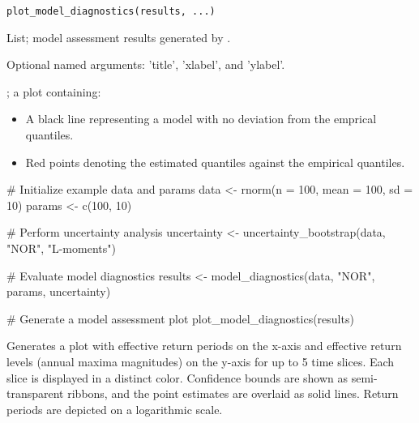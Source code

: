 \documentclass[a4paper]{book}
\begin{document}
%
\begin{Usage}
\begin{verbatim}
plot_model_diagnostics(results, ...)
\end{verbatim}
\end{Usage}
%
\begin{Arguments}
\begin{ldescription}
\item[\code{results}] List; model assessment results generated by .

\item[\code{...}] Optional named arguments: 'title', 'xlabel', and 'ylabel'.
\end{ldescription}
\end{Arguments}
%
\begin{Value}
; a plot containing:
\begin{itemize}

\item{} A black line representing a model with no deviation from the emprical quantiles.
\item{} Red points denoting the estimated quantiles against the empirical quantiles.

\end{itemize}

\end{Value}
%
\begin{Examples}
\begin{ExampleCode}
# Initialize example data and params
data <- rnorm(n = 100, mean = 100, sd = 10)
params <- c(100, 10)

# Perform uncertainty analysis
uncertainty <- uncertainty_bootstrap(data, "NOR", "L-moments")

# Evaluate model diagnostics
results <- model_diagnostics(data, "NOR", params, uncertainty)

# Generate a model assessment plot
plot_model_diagnostics(results)

\end{ExampleCode}
\end{Examples}
%
\begin{Description}
Generates a plot with effective return periods on the x-axis and effective return
levels (annual maxima magnitudes) on the y-axis for up to 5 time slices. Each slice
is displayed in a distinct color. Confidence bounds are shown as semi-transparent
ribbons, and the point estimates  are overlaid as solid lines. Return periods are
depicted on a logarithmic scale.
\end{Description}
\end{document}
